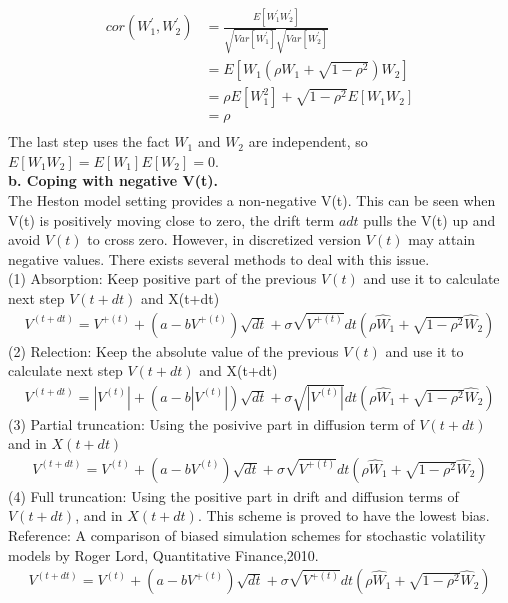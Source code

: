 \documentclass[a4paper]{article}
\begin{document}
\begin{align*}
	cor(W_1^{'}, W_2^{'}) & = \frac{E[W_1^{'}W_2^{'}]}{\sqrt{Var[W_1^{'}]}\sqrt{Var[W_2^{'}]}}\\
		      & = E[W_1 (\rho W_1 +\sqrt{1 - \rho^2})W_2] \\
		      & = \rho E[W_1^2] + \sqrt{1 - \rho^2} E[W_1 W_2] \\
		      & = \rho \\
\end{align*}
The last step uses the fact $W_1$ and $W_2$ are independent, so $E[W_1 W_2] = E[W_1] E[W_2] = 0$.\\
{\bf b. Coping with negative V(t). } \\
The Heston model setting provides a non-negative V(t). This can be seen when V(t) is positively moving close to zero, the drift term $adt$ pulls the V(t) up and avoid $V(t)$ to cross zero. However, in discretized version $V(t)$ may attain negative values. There exists several methods to deal with this issue.\\
(1) Absorption: Keep positive part of the previous $V(t)$ and use it to calculate next step $V(t+dt)$ and X(t+dt)\\
\begin{align*}
	V^{(t + dt)} = V^{+(t)} + (a - b V^{+(t)}) \sqrt{dt} + \sigma \sqrt{V^{+(t)}} dt (\rho \hat W_1
	+ \sqrt{1 - \rho^2} \hat W_2)
\end{align*}
(2) Relection: Keep the absolute value of the previous $V(t)$ and use it to calculate next step $V(t+dt)$ and X(t+dt)\\
\begin{align*}
	V^{(t + dt)} = |V^{(t)}| + (a - b |V^{(t)}|) \sqrt{dt} + \sigma \sqrt{|V^{(t)}|}  dt (\rho \hat W_1
	+ \sqrt{1 - \rho^2} \hat W_2)
\end{align*}
(3) Partial truncation: Using the posivive part in diffusion term of $V(t+dt)$ and in $X(t + dt)$\\
\begin{align*}
	V^{(t + dt)} = V^{(t)} + (a - b V^{(t)}) \sqrt{dt} + \sigma \sqrt{V^{+(t)}} dt (\rho \hat W_1
	+ \sqrt{1 - \rho^2} \hat W_2)
\end{align*}
(4) Full truncation: Using the positive part in drift and diffusion terms of $V(t + dt)$, and in $X(t + dt)$. 
This scheme is proved to have the lowest bias. Reference: A comparison of biased simulation schemes for stochastic volatility models by Roger Lord, Quantitative Finance,2010.
\begin{align*}
	V^{(t + dt)} = V^{(t)} + (a - b V^{+(t)}) \sqrt{dt} + \sigma \sqrt{V^{+(t)}} dt (\rho \hat W_1
	+ \sqrt{1 - \rho^2} \hat W_2)
\end{align*}
\end{document}
